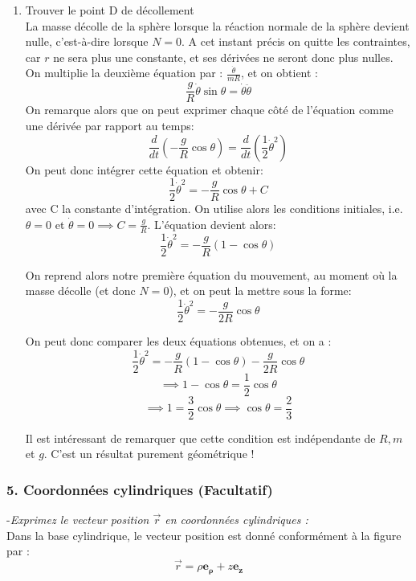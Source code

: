 \documentclass[a4paper,10pt,twoside]{article}
\begin{document}
\begin{enumerate}
\item Trouver le point D de décollement \\
La masse décolle de la sphère lorsque la réaction normale de la sphère devient nulle, c'est-à-dire lorsque $N = 0$. A cet instant précis on quitte les contraintes, car $r$ ne sera plus une constante, et ses dérivées ne seront donc plus nulles. On multiplie la deuxième équation par : $\frac{\dot{\theta}}{mR}$, et on obtient : 
\[ \frac{g}{R} \dot{\theta} \sin{\theta} = \dot{\theta} \ddot{\theta} \]
On remarque alors que on peut exprimer chaque côté de l'équation comme une dérivée par rapport au temps: 
\[ \frac{d}{dt}(-\frac{g}{R} \cos{\theta}) = \frac{d}{dt} (\frac{1}{2} \dot{\theta}^2) \]
On peut donc intégrer cette équation et obtenir:
\[ \frac{1}{2} \dot{\theta}^2 = - \frac{g}{R} \cos{\theta} + C \]
avec C la constante d'intégration. On utilise alors les conditions initiales, i.e. $\theta = 0$ et $\dot{\theta} = 0 \implies C = \frac{g}{R}$. L'équation devient alors: 
\[ \frac{1}{2} \dot{\theta}^2 = - \frac{g}{R}(1-\cos{\theta}) \]

On reprend alors notre première équation du mouvement, au moment où la masse décolle (et donc $N = 0$), et on peut la mettre sous la forme:
\[ \frac{1}{2} \dot{\theta}^2 = - \frac{g}{2R}\cos{\theta} \]

On peut donc comparer les deux équations obtenues, et on a : 
\[ \frac{1}{2} \dot{\theta}^2 = - \frac{g}{R}(1-\cos{\theta}) - \frac{g}{2R}\cos{\theta}\]
\[ \implies 1-\cos{\theta} = \frac{1}{2}\cos{\theta}\]
\[ \implies 1 = \frac{3}{2}\cos{\theta} \implies \cos{\theta} = \frac{2}{3}\]

Il est intéressant de remarquer que cette condition est indépendante de $R, m$ et $g$. C'est un résultat purement géométrique !

\end{enumerate}

\newpage



\subsubsection*{5. Coordonnées cylindriques (Facultatif) }

\noindent -\textit{Exprimez le vecteur position $\vec r$ en coordonnées cylindriques :} \\
Dans la base cylindrique, le vecteur position est donné conformément à la figure par :
\[\vec r = \rho\mathbf{ e_\rho} + z\mathbf{ e_z}\]
\end{document}
